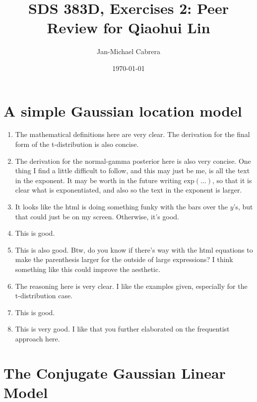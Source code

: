 \documentclass[10pt]{article}
\begin{document}
    \title{SDS 383D, Exercises 2: Peer Review for Qiaohui Lin}
    \author{Jan-Michael Cabrera}
    \date{\today}
    \maketitle

    \section*{A simple Gaussian location model}

    \begin{enumerate}[label=(\Alph*)]

      \item The mathematical definitions here are very clear. The derivation for the final form of the t-distribution is also concise.

      \item The derivation for the normal-gamma posterior here is also very concise. One thing I find a little difficult to follow, and this may just be me, is all the text in the exponent. It may be worth in the future writing $\text{exp}( \dots )$, so that it is clear what is exponentiated, and also so the text in the exponent is larger.

      \item It looks like the html is doing something funky with the bars over the $y$'s, but that could just be on my screen. Otherwise, it's good.

      \item This is good. 

      \item This is also good. Btw, do you know if there's way with the html equations to make the parenthesis larger for the outside of large expressions? I think something like this could improve the aesthetic. 

      \item The reasoning here is very clear. I like the examples given, especially for the t-distribution case.

      \item This is good.

      \item This is very good. I like that you further elaborated on the frequentist approach here.

    \end{enumerate}

    \section*{The Conjugate Gaussian Linear Model}
\end{document}
